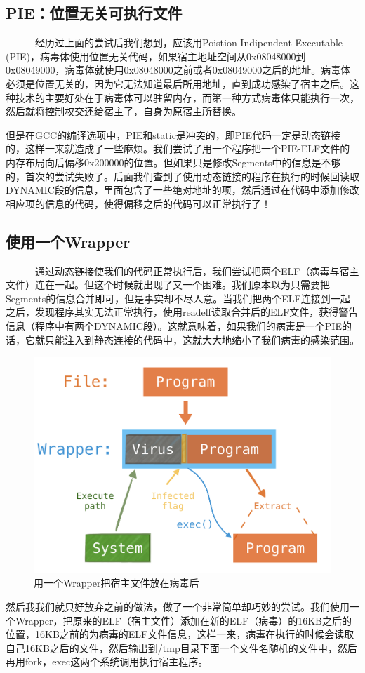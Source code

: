 \documentclass[11pt]{article}
\begin{document}
\subsection{PIE：位置无关可执行文件}
~~~~~~经历过上面的尝试后我们想到，应该用Poistion Indipendent Executable (PIE)，病毒体使用位置无关代码，如果宿主地址空间从0x08048000到0x08049000，病毒体就使用0x08048000之前或者0x08049000之后的地址。病毒体必须是位置无关的，因为它无法知道最后所用地址，直到成功感染了宿主之后。这种技术的主要好处在于病毒体可以驻留内存，而第一种方式病毒体只能执行一次，然后就将控制权交还给宿主了，自身为原宿主所替换。

但是在GCC的编译选项中，PIE和static是冲突的，即PIE代码一定是动态链接的，这样一来就造成了一些麻烦。我们尝试了用一个程序把一个PIE-ELF文件的内存布局向后偏移0x200000的位置。但如果只是修改Segments中的信息是不够的，首次的尝试失败了。后面我们查到了使用动态链接的程序在执行的时候回读取DYNAMIC段的信息，里面包含了一些绝对地址的项，然后通过在代码中添加修改相应项的信息的代码，使得偏移之后的代码可以正常执行了！

\subsection{使用一个Wrapper}
~~~~~~通过动态链接使我们的代码正常执行后，我们尝试把两个ELF（病毒与宿主文件）连在一起。但这个时候就出现了又一个困难。我们原本以为只需要把Segments的信息合并即可，但是事实却不尽人意。当我们把两个ELF连接到一起之后，发现程序其实无法正常执行，使用readelf读取合并后的ELF文件，获得警告信息（程序中有两个DYNAMIC段）。这就意味着，如果我们的病毒是一个PIE的话，它就只能注入到静态连接的代码中，这就大大地缩小了我们病毒的感染范围。
	\begin{figure}[htbp]
		\centering
		\includegraphics[width = \textwidth]{figures/fig2_wrapper}
		\caption{用一个Wrapper把宿主文件放在病毒后}
		\label{fig:way3}
	\end{figure}
然后我我们就只好放弃之前的做法，做了一个非常简单却巧妙的尝试。我们使用一个Wrapper，把原来的ELF（宿主文件）添加在新的ELF（病毒）的16KB之后的位置，16KB之前的为病毒的ELF文件信息，这样一来，病毒在执行的时候会读取自己16KB之后的文件，然后输出到/tmp目录下面一个文件名随机的文件中，然后再用fork，exec这两个系统调用执行宿主程序。
\end{document}
